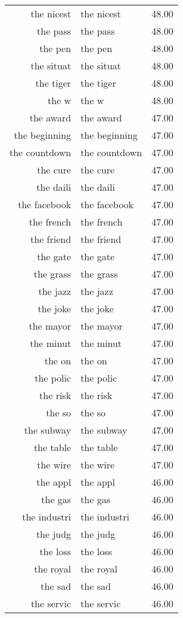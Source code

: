 \begin{table}[ht]
\begin{tabular}{rlr}
  the nicest & the nicest & 48.00 \\ 
  the pass & the pass & 48.00 \\ 
  the pen & the pen & 48.00 \\ 
  the situat & the situat & 48.00 \\ 
  the tiger & the tiger & 48.00 \\ 
  the w & the w & 48.00 \\ 
  the award & the award & 47.00 \\ 
  the beginning & the beginning & 47.00 \\ 
  the countdown & the countdown & 47.00 \\ 
  the cure & the cure & 47.00 \\ 
  the daili & the daili & 47.00 \\ 
  the facebook & the facebook & 47.00 \\ 
  the french & the french & 47.00 \\ 
  the friend & the friend & 47.00 \\ 
  the gate & the gate & 47.00 \\ 
  the grass & the grass & 47.00 \\ 
  the jazz & the jazz & 47.00 \\ 
  the joke & the joke & 47.00 \\ 
  the mayor & the mayor & 47.00 \\ 
  the minut & the minut & 47.00 \\ 
  the on & the on & 47.00 \\ 
  the polic & the polic & 47.00 \\ 
  the risk & the risk & 47.00 \\ 
  the so & the so & 47.00 \\ 
  the subway & the subway & 47.00 \\ 
  the table & the table & 47.00 \\ 
  the wire & the wire & 47.00 \\ 
  the appl & the appl & 46.00 \\ 
  the gas & the gas & 46.00 \\ 
  the industri & the industri & 46.00 \\ 
  the judg & the judg & 46.00 \\ 
  the loss & the loss & 46.00 \\ 
  the royal & the royal & 46.00 \\ 
  the sad & the sad & 46.00 \\ 
  the servic & the servic & 46.00 \\ 

\end{tabular}
\end{table}
